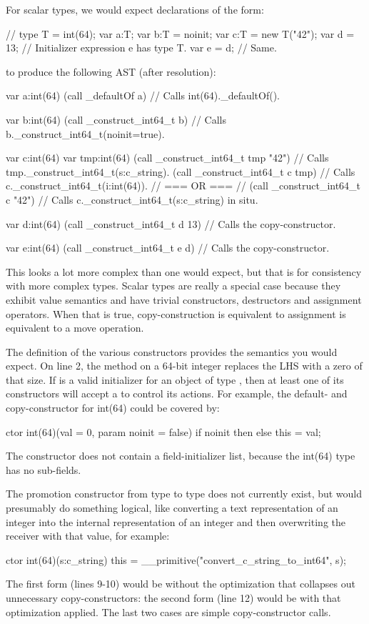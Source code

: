 For scalar types, we would expect declarations of the form:
\begin{chapel}
// type T = int(64);
   var a:T;
   var b:T = noinit;
   var c:T = new T("42");
   var d = 13; // Initializer expression e has type T.
   var e = d; // Same.
\end{chapel}
\noindent
to produce the following AST (after resolution):
\begin{numberedchapel}
    var a:int(64)
    (call _defaultOf a) // Calls int(64)._defaultOf().

    var b:int(64)
    (call _construct_int64_t b) // Calls b._construct_int64_t(noinit=true).

    var c:int(64)
    var tmp:int(64)
    (call _construct_int64_t tmp "42") // Calls tmp._construct_int64_t(s:c_string).
    (call _construct_int64_t c tmp) // Calls c._construct_int64_t(i:int(64)).
    // === OR === //
    (call _construct_int64_t c "42") // Calls c._construct_int64_t(s:c_string) in situ.

    var d:int(64)
    (call _construct_int64_t d 13) // Calls the copy-constructor.

    var e:int(64)
    (call _construct_int64_t e d) // Calls the copy-constructor.
\end{numberedchapel}
This looks a lot more complex than one would expect, but that is for consistency with more
complex types.  Scalar types are really a special case because they exhibit value
semantics and have trivial constructors, destructors and assignment operators.  When that
is true, copy-construction is equivalent to assignment is equivalent to a move operation.

The definition of the various constructors provides the semantics you would expect.  On
line 2, the  method on a 64-bit integer replaces the LHS with a zero of
that size.  If  is a valid initializer for an object of type ,
then at least one of its constructors will accept a  to control its
actions.  For example, the default- and copy-constructor for int(64) could be covered by:
\begin{chapel}
  ctor int(64)(val = 0, param noinit = false) {
    if noinit then { }
    else { this = val; }
  }
\end{chapel}
\noindent
The constructor does not contain a field-initializer list, because the int(64) type has no
sub-fields.

The promotion constructor from type  to type  does not
currently exist, but would presumably do something logical,
like converting a text representation of an integer into the internal representation of an
integer and then overwriting the receiver with that value, for example:
\begin{chapel}
  ctor int(64)(s:c_string) {
    this = __primitive("convert_c_string_to_int64", s);
  }
\end{chapel}
\noindent
The first form (lines 9-10) would be without the optimization that collapses out
unnecessary copy-constructors: the second form (line 12) would be with that optimization
applied.  The last two cases are simple copy-constructor calls.

